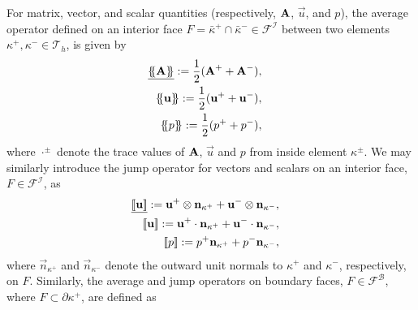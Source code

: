         For matrix, vector, and scalar quantities (respectively, $\boldsymbol{\mathbf{A}}$, $\vec{u}$, and $p$), the average operator defined on an interior face $F = \bar{\kappa}^+ \cap \bar{\kappa}^- \in \mathcal{F}^\mathcal{I}$ between two elements $\kappa^+, \kappa^- \in \mathcal{T}_h$, is given by
        \begin{align*}
            \begin{split}
                \underline{\{\negthickspace\{\boldsymbol{\mathbf{A}}\}\negthickspace\}} & := \frac{1}{2} (\boldsymbol{\mathbf{A}}^+ + \boldsymbol{\mathbf{A}}^-),
            \end{split}\\
            \begin{split}
                \{\negthickspace\{\boldsymbol{\mathbf{u}}\}\negthickspace\} & := \frac{1}{2} (\boldsymbol{\mathbf{u}}^+ + \boldsymbol{\mathbf{u}}^-),
            \end{split}\\
            \begin{split}
                \{\negthickspace\{p\}\negthickspace\} & := \frac{1}{2} (p^+ + p^-),
            \end{split}
        \end{align*}
        where $\cdot^\pm$ denote the trace values of $\boldsymbol{\mathbf{A}}$, $\vec{u}$ and $p$ from inside element $\kappa^\pm$. We may similarly introduce the jump operator for vectors and scalars on an interior face, $F \in \mathcal{F}^\mathcal{I}$, as
        \begin{align*}
            \begin{split}
                \underline{[\negthinspace[ \boldsymbol{\mathbf{u}} ]\negthinspace]} & := \boldsymbol{\mathbf{u}}^+ \otimes \boldsymbol{\mathbf{n}}_{\kappa^+} + \boldsymbol{\mathbf{u}}^- \otimes \boldsymbol{\mathbf{n}}_{\kappa^-},
            \end{split}\\
            \begin{split}
                [\negthinspace[ \boldsymbol{\mathbf{u}} ]\negthinspace] & := \boldsymbol{\mathbf{u}}^+ \cdot \boldsymbol{\mathbf{n}}_{\kappa^+} + \boldsymbol{\mathbf{u}}^- \cdot \boldsymbol{\mathbf{n}}_{\kappa^-},
            \end{split}\\
            \begin{split}
                [\negthinspace[ p ]\negthinspace] & := p^+ \boldsymbol{\mathbf{n}}_{\kappa^+} + p^- \boldsymbol{\mathbf{n}}_{\kappa^-},
            \end{split}
        \end{align*}
        where $\vec{n}_{\kappa^+}$ and $\vec{n}_{\kappa^-}$ denote the outward unit normals to $\kappa^+$ and $\kappa^-$, respectively, on $F$. Similarly, the average and jump operators on boundary faces, $F \in \mathcal{F}^\mathcal{B}$, where $F \subset \partial \kappa^+$, are defined as
